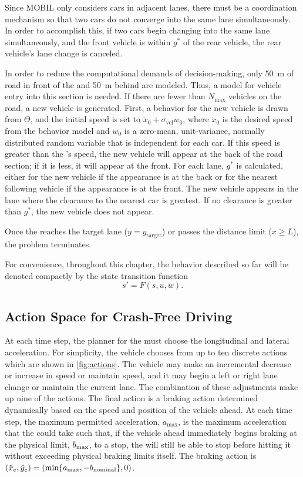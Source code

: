 Since MOBIL only considers cars in adjacent lanes, there must be a coordination mechanism so that two cars do not converge into the same lane simultaneously.
In order to accomplish this, if two cars begin changing into the same lane simultaneously, and the front vehicle is within $g^*$ of the rear vehicle, the rear vehicle's lane change is canceled.

In order to reduce the computational demands of decision-making, only \SI{50}{\meter} of road in front of the \av{} and \SI{50}{\meter} behind are modeled. %
Thus, a model for vehicle entry into this section is needed.
If there are fewer than $N_\text{max}$ vehicles on the road, a new vehicle is generated.
First, a behavior for the new vehicle is drawn from $\Theta$, and the initial speed is set to $\dot{x}_0 + \sigma_\text{vel} w_0$, where $\dot{x}_0$ is the desired speed from the behavior model and $w_0$ is a zero-mean, unit-variance, normally distributed random variable that is independent for each car.
If this speed is greater than the \av{}'s speed, the new vehicle will appear at the back of the road section; if it is less, it will appear at the front.
For each lane, $g^*$ is calculated, either for the new vehicle if the appearance is at the back or for the nearest following vehicle if the appearance is at the front.
The new vehicle appears in the lane where the clearance to the nearest car is greatest.
If no clearance is greater than $g^*$, the new vehicle does not appear.

Once the \av{} reaches the target lane ($y = y_\text{target}$) or passes the distance limit ($x \geq L$), the problem terminates.

For convenience, throughout this chapter, the behavior described so far will be denoted compactly by the state transition function
    \begin{equation}
        s' = F(s,u,w) \text{.}
    \end{equation}

\subsection{Action Space for Crash-Free Driving} \label{sec:action}

At each time step, the planner for the \av{} must choose the longitudinal and lateral acceleration.
For simplicity, the vehicle chooses from up to ten discrete actions which are shown in \cref{fig:actions}.
The vehicle may make an incremental decrease or increase in speed or maintain speed, and it may begin a left or right lane change or maintain the current lane.
The combination of these adjustments make up nine of the actions.
The final action is a braking action determined dynamically based on the speed and position of the vehicle ahead.
At each time step, the maximum permitted acceleration, $a_\text{max}$, is the maximum acceleration that the \av{} could take such that, if the  vehicle ahead immediately begins braking at the physical limit, $b_\text{max}$, to a stop, the \av{} will still be able to stop before hitting it without exceeding physical braking limits itself.
The braking action is $({\ddot{x}}_e, {\ddot{y}}_e) = (\min \{a_\text{max}, -b_\text{nominal} \}, 0)$.

